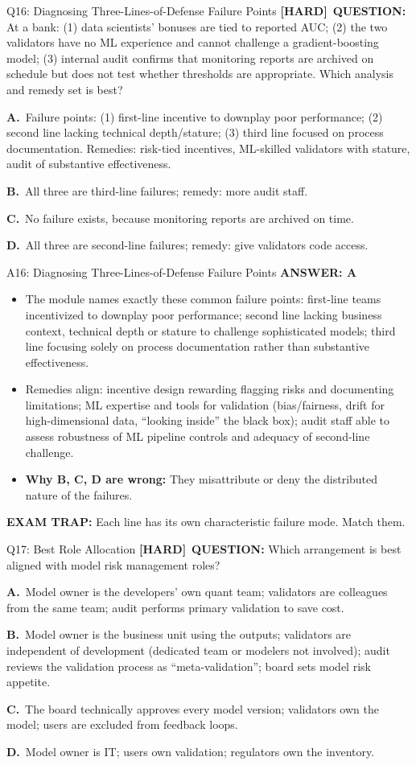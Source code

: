 \documentclass[8pt]{beamer}
\newcommand{\fs}{\fontsize{10}{12}\selectfont}
\newcommand{\opts}[4]{\par\vspace{0.12cm}\noindent\textbf{A.}~#1\par\vspace{0.08cm}\noindent\textbf{B.}~#2\par\vspace{0.08cm}\noindent\textbf{C.}~#3\par\vspace{0.08cm}\noindent\textbf{D.}~#4\par}
\newcommand{\ans}[1]{\textcolor{myblue}{\textbf{ANSWER: #1}}}
\newcommand{\trap}[1]{\textcolor{myred}{\textbf{EXAM TRAP:}} #1}
\newcommand{\hard}{\textcolor{myorange}{\textbf{[HARD]}}}
\begin{document}
\begin{frame}[t]{Q16: Diagnosing Three-Lines-of-Defense Failure Points}
\fs
\hard\ \textbf{QUESTION:} At a bank: (1) data scientists' bonuses are tied to reported AUC; (2) the two validators have no ML experience and cannot challenge a gradient-boosting model; (3) internal audit confirms that monitoring reports are archived on schedule but does not test whether thresholds are appropriate. Which analysis and remedy set is best?
\opts{Failure points: (1) first-line incentive to downplay poor performance; (2) second line lacking technical depth/stature; (3) third line focused on process documentation. Remedies: risk-tied incentives, ML-skilled validators with stature, audit of substantive effectiveness.}
{All three are third-line failures; remedy: more audit staff.}
{No failure exists, because monitoring reports are archived on time.}
{All three are second-line failures; remedy: give validators code access.}
\end{frame}

\begin{frame}[t]{A16: Diagnosing Three-Lines-of-Defense Failure Points}
\fs
\ans{A}
\begin{itemize}
\item The module names exactly these common failure points: first-line teams incentivized to downplay poor performance; second line lacking business context, technical depth or stature to challenge sophisticated models; third line focusing solely on process documentation rather than substantive effectiveness.
\item Remedies align: incentive design rewarding flagging risks and documenting limitations; ML expertise and tools for validation (bias/fairness, drift for high-dimensional data, ``looking inside'' the black box); audit staff able to assess robustness of ML pipeline controls and adequacy of second-line challenge.
\item \textbf{Why B, C, D are wrong:} They misattribute or deny the distributed nature of the failures.
\end{itemize}
\trap{Each line has its \textcolor{myblue}{own} characteristic failure mode. Match them.}
\end{frame}

\begin{frame}[t]{Q17: Best Role Allocation}
\fs
\hard\ \textbf{QUESTION:} Which arrangement is best aligned with model risk management roles?
\opts{Model owner is the developers' own quant team; validators are colleagues from the same team; audit performs primary validation to save cost.}
{Model owner is the business unit using the outputs; validators are independent of development (dedicated team or modelers not involved); audit reviews the validation process as ``meta-validation''; board sets model risk appetite.}
{The board technically approves every model version; validators own the model; users are excluded from feedback loops.}
{Model owner is IT; users own validation; regulators own the inventory.}
\end{frame}
\end{document}
